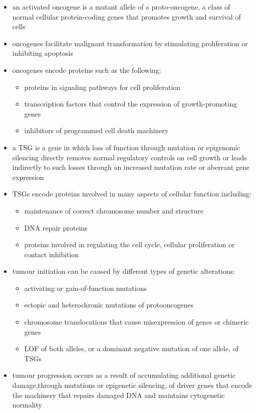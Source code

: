 \documentclass[12pt]{scrartcl}
\begin{document}
\begin{itemize}
\item an activated oncogene is a mutant allele of a proto-oncogene, a
class of normal cellular protein-coding genes that promotes growth
and survival of cells
\item oncogenes facilitate malignant transformation by stimulating
proliferation or inhibiting apoptosis
\item oncogenes encode proteins such as the following:
\begin{itemize}
\item proteins in signaling pathways for cell proliferation
\item transcription factors that control the expression of growth-promoting genes
\item inhibitors of programmed cell death machinery
\end{itemize}
\item a TSG is a gene in which loss of function through mutation or
epigenomic silencing directly removes normal regulatory controls on
cell growth or leads indirectly to such losses through an increased
mutation rate or aberrant gene expression
\item TSGs encode proteins involved in many aspects of cellular function including:
\begin{itemize}
\item maintenance of correct chromosome number and structure
\item DNA repair proteins
\item proteins involved in regulating the cell cycle, cellular
proliferation or contact inhibition
\end{itemize}

\item tumour initiation can be caused by different types of genetic
alterations:
\begin{itemize}
\item activating or gain-of-function mutations
\item ectopic and heterochronic mutations of protooncogenes
\item chromosome translocations that cause misexpression of genes or chimeric genes
\item LOF of both alleles, or a dominant negative mutation of one allele, of TSGs
\end{itemize}

\item tumour progression occurs as a result of accumulating additional
genetic damage,through mutations or epigenetic silencing, of driver
genes that encode the machinery that repairs damaged DNA and
maintains cytogenetic normality
\end{itemize}
\end{document}
